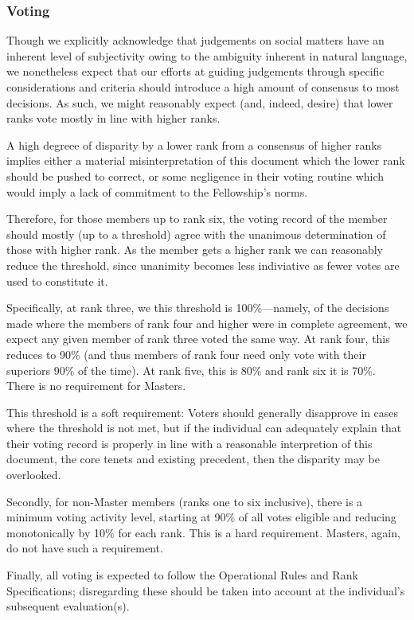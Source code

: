 \documentclass[9pt,oneside]{amsart}
\begin{document}
\subsubsection{Voting}

Though we explicitly acknowledge that judgements on social matters have an inherent level of subjectivity owing to the ambiguity inherent in natural language, we nonetheless expect that our efforts at guiding judgements through specific considerations and criteria should introduce a high amount of consensus to most decisions. As such, we might reasonably expect (and, indeed, desire) that lower ranks vote mostly in line with higher ranks.

A high degreee of disparity by a lower rank from a consensus of higher ranks implies either a material misinterpretation of this document which the lower rank should be pushed to correct, or some negligence in their voting routine which would imply a lack of commitment to the Fellowship's norms.

Therefore, for those members up to rank six, the voting record of the member should mostly (up to a threshold) agree with the unanimous determination of those with higher rank. As the member gets a higher rank we can reasonably reduce the threshold, since unanimity becomes less indiviative as fewer votes are used to constitute it.

Specifically, at rank three, we this threshold is 100\%---namely, of the decisions made where the members of rank four and higher were in complete agreement, we expect any given member of rank three voted the same way. At rank four, this reduces to 90\% (and thus members of rank four need only vote with their superiors 90\% of the time). At rank five, this is 80\% and rank six it is 70\%. There is no requirement for Masters.

This threshold is a soft requirement: Voters should generally disapprove in cases where the threshold is not met, but if the individual can adequately explain that their voting record is properly in line with a reasonable interpretion of this document, the core tenets and existing precedent, then the disparity may be overlooked.

Secondly, for non-Master members (ranks one to six inclusive), there is a minimum voting activity level, starting at 90\% of all votes eligible and reducing monotonically by 10\% for each rank. This is a hard requirement. Masters, again, do not have such a requirement.

Finally, all voting is expected to follow the Operational Rules and Rank Specifications; disregarding these should be taken into account at the individual's subsequent evaluation(s).
\end{document}
